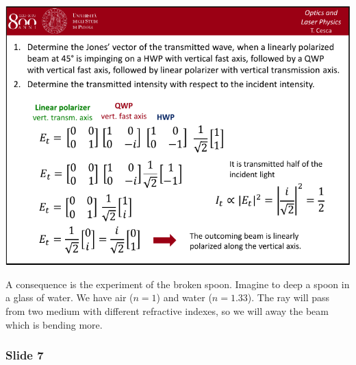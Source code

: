 \documentclass[../main/main.tex]{subfiles}
\begin{document}
\begin{minipage}[]{0.5\linewidth}
\centering
\includegraphics[page=6,width=1\textwidth]{../lessons/pdf_file/04_lecture.pdf}
\end{minipage}
\hspace{0.3cm}\vspace{0.3cm}
\begin{minipage}[c]{0.47\linewidth}

A consequence is the experiment of the broken spoon. Imagine to deep a spoon in a glass of water. We have air (\( n=1 \)) and water (\( n=1.33 \)). The ray will pass from two medium with different refractive indexes, so we will away the beam which is bending more.

\end{minipage}

\newpage

\subsubsection*{Slide 7}
\end{document}
